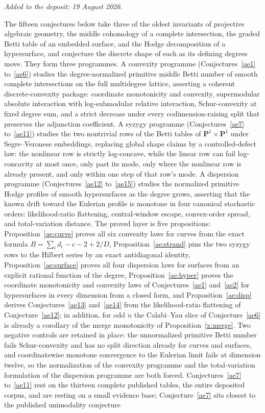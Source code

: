 \documentclass[11pt]{article}
\theoremstyle{definition}
\begin{document}
\medskip\noindent\emph{Added to the deposit: 19 August 2026.}\par\medskip

The fifteen conjectures below take three of the oldest invariants of projective algebraic geometry, the middle cohomology of a complete intersection, the graded Betti table of an embedded surface, and the Hodge decomposition of a hypersurface, and conjecture the discrete shape of each as its defining degrees move.  They form three programmes.  A convexity programme (Conjectures~\ref{ae1} to~\ref{ae6}) studies the degree-normalized primitive middle Betti number of smooth complete intersections on the full multidegree lattice, asserting a coherent discrete-convexity package: coordinate monotonicity and convexity, supermodular absolute interaction with log-submodular relative interaction, Schur-convexity at fixed degree sum, and a strict decrease under every codimension-raising split that preserves the adjunction coefficient.  A syzygy programme (Conjectures~\ref{ae7} to~\ref{ae11}) studies the two nontrivial rows of the Betti tables of $\mathbf P^1\times\mathbf P^1$ under Segre--Veronese embeddings, replacing global shape claims by a controlled-defect law: the nonlinear row is strictly log-concave, while the linear row can fail log-concavity at most once, only past its mode, only where the nonlinear row is already present, and only within one step of that row's mode.  A dispersion programme (Conjectures~\ref{ae12} to~\ref{ae15}) studies the normalized primitive Hodge profiles of smooth hypersurfaces as the degree grows, asserting that the known drift toward the Eulerian profile is monotone in four canonical stochastic orders: likelihood-ratio flattening, central-window escape, convex-order spread, and total-variation distance.  The proved layer is five propositions: Proposition~\ref{ae:curve} proves all six convexity laws for curves from the exact formula $B=\sum_id_i-c-2+2/D$, Proposition~\ref{ae:strand} pins the two syzygy rows to the Hilbert series by an exact antidiagonal identity, Proposition~\ref{ae:surface} proves all four dispersion laws for surfaces from an explicit rational function of the degree, Proposition~\ref{ae:hyper} proves the coordinate monotonicity and convexity laws of Conjectures~\ref{ae1} and~\ref{ae2} for hypersurfaces in every dimension from a closed form, and Proposition~\ref{ae:disp} derives Conjectures~\ref{ae13} and~\ref{ae14} from the likelihood-ratio flattening of Conjecture~\ref{ae12}; in addition, for odd $n$ the Calabi--Yau slice of Conjecture~\ref{ae6} is already a corollary of the merge monotonicity of Proposition~\ref{x:merge}.  Two negative controls are retained in place: the unnormalized primitive Betti number fails Schur-convexity and has no split direction already for curves and surfaces, and coordinatewise monotone convergence to the Eulerian limit fails at dimension twelve, so the normalization of the convexity programme and the total-variation formulation of the dispersion programme are both forced.  Conjectures~\ref{ae7} to~\ref{ae11} rest on the thirteen complete published tables, the entire deposited corpus, and are resting on a small evidence base; Conjecture~\ref{ae7} sits closest to the published unimodality conjecture 
\end{document}
